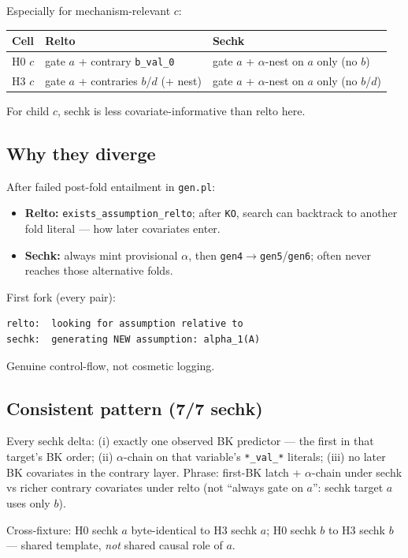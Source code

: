 \documentclass[11pt]{article}
\begin{document}
Especially for mechanism-relevant $c$:
\begin{center}
\begin{tabular}{@{}lL{0.38\textwidth}L{0.42\textwidth}@{}}
\toprule
Cell & Relto & Sechk \\
\midrule
H0 $c$ & gate $a$ + contrary \texttt{b\_val\_0} &
  gate $a$ + $\alpha$-nest on $a$ only (no $b$) \\
H3 $c$ & gate $a$ + contraries $b$/$d$ (+ nest) &
  gate $a$ + $\alpha$-nest on $a$ only (no $b$/$d$) \\
\bottomrule
\end{tabular}
\end{center}
For child $c$, sechk is less covariate-informative than relto here.

\subsection{Why they diverge}

After failed post-fold entailment in \texttt{gen.pl}:
\begin{itemize}
  \item \textbf{Relto:} \texttt{exists\_assumption\_relto}; after \texttt{KO},
    search can backtrack to another fold literal --- how later covariates enter.
  \item \textbf{Sechk:} always mint provisional $\alpha$, then
    \texttt{gen4}$\to$\texttt{gen5}/\texttt{gen6}; often never reaches those
    alternative folds.
\end{itemize}
First fork (every pair):
\begin{verbatim}
relto:  looking for assumption relative to
sechk:  generating NEW assumption: alpha_1(A)
\end{verbatim}
Genuine control-flow, not cosmetic logging.

\subsection{Consistent pattern (7/7 sechk)}

Every sechk delta: (i) exactly one observed BK predictor --- the first in that
target's BK order; (ii) $\alpha$-chain on that variable's \texttt{*\_val\_*}
literals; (iii) no later BK covariates in the contrary layer.
Phrase: first-BK latch + $\alpha$-chain under sechk vs richer contrary
covariates under relto (not ``always gate on $a$'': sechk target $a$ uses only
$b$).

Cross-fixture: H0 sechk $a$ byte-identical to H3 sechk $a$; H0 sechk $b$ to
H3 sechk $b$ --- shared template, \emph{not} shared causal role of $a$.
\end{document}
